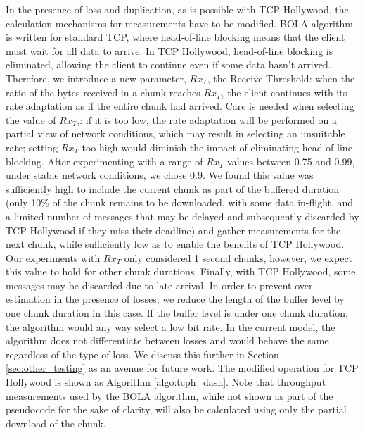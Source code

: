 In the presence of loss and duplication, as is possible with TCP Hollywood, the calculation 
mechanisms for measurements have to be modified. BOLA algorithm is written for standard TCP, where head-of-line blocking means that the client must wait for all data to arrive. In TCP Hollywood, head-of-line blocking is eliminated, allowing the client to continue even if some data hasn't arrived. Therefore, we introduce a new parameter, $Rx_{T}$, the Receive Threshold: when the ratio of the bytes received in a chunk reaches $Rx_{T}$, the client continues with its rate adaptation as if the entire chunk had arrived. Care is needed when selecting the value of $Rx_{T}$,: if it is too low, the rate adaptation will be performed on a partial view of network conditions, which may result in selecting an unsuitable rate; setting $Rx_{T}$ too high would diminish the impact of eliminating head-of-line blocking. After experimenting with a range of $Rx_{T}$ values between 0.75 and 0.99, under stable network conditions, we chose 0.9. We found this value was sufficiently high to include the current chunk as part of the buffered duration (only 10\% of the chunk remains to be downloaded, with some data in-flight, and a limited number of messages that may be delayed and subsequently discarded by TCP Hollywood if they miss their deadline) and gather measurements for the next chunk, while sufficiently low as to enable the benefits of TCP Hollywood. Our experiments with $Rx_{T}$ only considered 1 second chunks, however, we expect this value to hold for other chunk durations. Finally, with TCP Hollywood, some messages may be discarded due to late arrival. In order to prevent over-estimation in the presence of losses, we reduce the length of the buffer level by one chunk duration in this case. If the buffer level is under one chunk duration, the algorithm would any way select a low bit rate. In the current model, the algorithm does not differentiate between losses and would behave the same regardless of the type of loss. We discuss this further in Section \ref{sec:other_testing} as an avenue for future work. The modified operation for TCP Hollywood is shown as Algorithm \ref{algo:tcph_dash}. Note that throughput measurements used by the BOLA algorithm, while not shown as part of the pseudocode for the sake of clarity, will also be calculated using only the partial download of the chunk.

